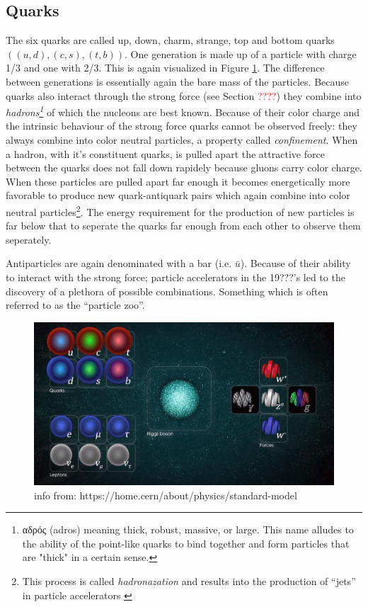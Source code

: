 \subsection{Quarks}
\label{sub:quarks}
The six quarks are called up, down, charm, strange, top and bottom quarks $((u,d),(c,s),(t,b))$.
One generation is made up of a particle with charge 1/3 and one with 2/3. This is again visualized in Figure \ref{SMparticles}.
The difference between generations is essentially again the bare mass of the particles. Because quarks also interact through the strong force (see Section \textcolor{red}{????}) they combine into 
\textit{hadrons\footnote{\gr αδρός \en (adros) meaning thick, robust, massive, or large. This name alludes to the ability of the point-like quarks to bind together and form particles that are "thick" in a certain sense.}} of which the nucleons are best known. Because of their color charge and the intrinsic behaviour of the strong force quarks cannot be observed freely: they always combine into color neutral particles, a property called \textit{confinement}. When a hadron, with it's constituent quarks, is pulled apart the attractive force between the quarks does not fall down rapidely because gluons carry color charge. When these particles are pulled apart far enough it becomes energetically more favorable to produce new quark-antiquark pairs which again combine into color neutral particles\footnote{This process is called \textit{hadronazation} and results into the production of ``jets'' in particle accelerators \cite{cmsjetsurl}}. The energy requirement for the production of new particles is far below that to seperate the quarks far enough from each other to observe them seperately.

Antiparticles are again denominated with a bar (i.e. $\bar{u}$). Because of their ability to interact with the strong force; particle accelerators in the 19???'s led to the discovery of a plethora of possible combinations. Something which is often referred to as the ``particle zoo''.

\begin{figure}
\centering
\includegraphics[width = \textwidth]{chapter1/img/SMparticles}
\caption{info from: https://home.cern/about/physics/standard-model}
\label{SMparticles}
\end{figure}

